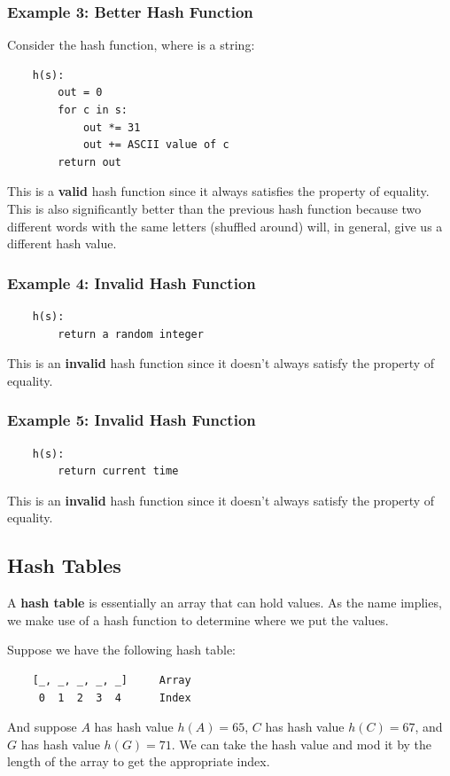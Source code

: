 \documentclass[letterpaper]{article}
\begin{document}
\subsubsection{Example 3: Better Hash Function}
Consider the hash function, where  is a string: 
\begin{verbatim}
    h(s):
        out = 0
        for c in s: 
            out *= 31 
            out += ASCII value of c 
        return out 
\end{verbatim}
This is a \textbf{valid} hash function since it always satisfies the property of equality. This is also significantly better than the previous hash function because two different words with the same letters (shuffled around) will, in general, give us a different hash value. 

\subsubsection{Example 4: Invalid Hash Function}
\begin{verbatim}
    h(s): 
        return a random integer 
\end{verbatim}
This is an \textbf{invalid} hash function since it doesn't always satisfy the property of equality.

\subsubsection{Example 5: Invalid Hash Function}
\begin{verbatim}
    h(s): 
        return current time  
\end{verbatim}
This is an \textbf{invalid} hash function since it doesn't always satisfy the property of equality. 

\subsection{Hash Tables}
A \textbf{hash table} is essentially an array that can hold values. As the name implies, we make use of a hash function to determine where we put the values. 

\bigskip

Suppose we have the following hash table: 
\begin{verbatim}
    [_, _, _, _, _]     Array 
     0  1  2  3  4      Index 
\end{verbatim}

And suppose $A$ has hash value $h(A) = 65$, $C$ has hash value $h(C) = 67$, and $G$ has hash value $h(G) = 71$. We can take the hash value and mod it by the length of the array to get the appropriate index. 
\end{document}
